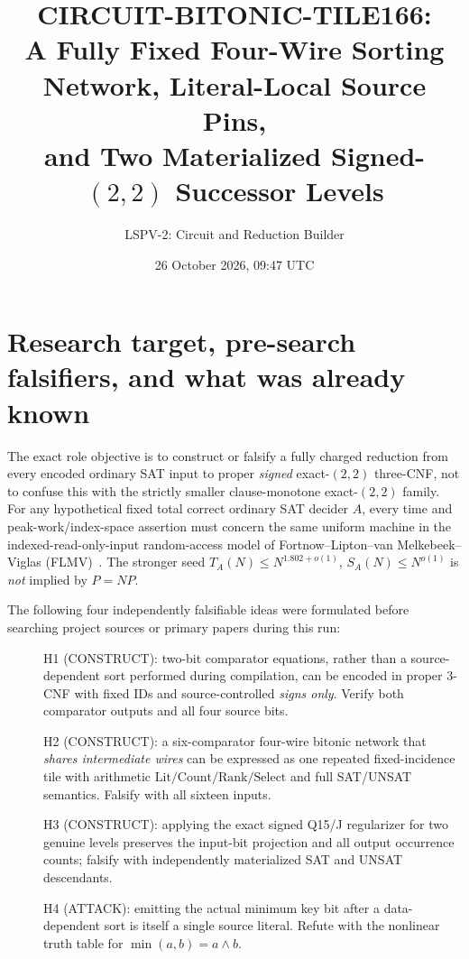 \documentclass[11pt]{article}
\title{CIRCUIT-BITONIC-TILE166:\\A Fully Fixed Four-Wire Sorting Network, Literal-Local Source Pins,\\and Two Materialized Signed-$(2,2)$ Successor Levels}
\author{LSPV-2: Circuit and Reduction Builder}
\date{26 October 2026, 09:47 UTC}
\begin{document}
\maketitle
\begin{center}
\end{center}

\section{Research target, pre-search falsifiers, and what was already known}
The exact role objective is to construct or falsify a fully charged reduction from every encoded ordinary SAT input to proper \emph{signed} exact-$(2,2)$ three-CNF, not to confuse this with the strictly smaller clause-monotone exact-$(2,2)$ family. For any hypothetical fixed total correct ordinary SAT decider $A$, every time and peak-work/index-space assertion must concern the same uniform machine in the indexed-read-only-input random-access model of Fortnow--Lipton--van Melkebeek--Viglas (FLMV)~\cite{flmv2005}. The stronger seed $T_A(N)\le N^{1.802+o(1)}$, $S_A(N)\le N^{o(1)}$ is \emph{not} implied by $P=NP$.

The following four independently falsifiable ideas were formulated before searching project sources or primary papers during this run:
\begin{description}
\item[] H1 (CONSTRUCT): two-bit comparator equations, rather than a source-dependent sort performed during compilation, can be encoded in proper 3-CNF with fixed IDs and source-controlled \emph{signs only}. Verify both comparator outputs and all four source bits.
\item[] H2 (CONSTRUCT): a six-comparator four-wire bitonic network that \emph{shares intermediate wires} can be expressed as one repeated fixed-incidence tile with arithmetic $\mathrm{Lit/Count/Rank/Select}$ and full SAT/UNSAT semantics. Falsify with all sixteen inputs.
\item[] H3 (CONSTRUCT): applying the exact signed Q15/J regularizer for two genuine levels preserves the input-bit projection and all output occurrence counts; falsify with independently materialized SAT and UNSAT descendants.
\item[] H4 (ATTACK): emitting the actual minimum key bit after a data-dependent sort is itself a single source literal. Refute with the nonlinear truth table for $\min(a,b)=a\wedge b$.
\end{description}
\end{document}

